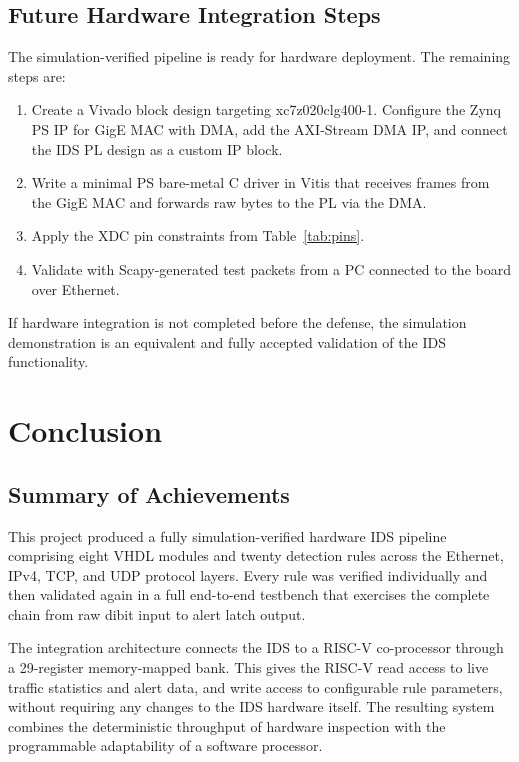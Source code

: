 \documentclass[12pt, a4paper]{report}
\begin{document}
\section{Future Hardware Integration Steps}

The simulation-verified pipeline is ready for hardware deployment. The remaining steps are:

\begin{enumerate}
    \item Create a Vivado block design targeting xc7z020clg400-1. Configure the Zynq PS IP for GigE MAC with DMA, add the AXI-Stream DMA IP, and connect the IDS PL design as a custom IP block.
    \item Write a minimal PS bare-metal C driver in Vitis that receives frames from the GigE MAC and forwards raw bytes to the PL via the DMA.
    \item Apply the XDC pin constraints from Table~\ref{tab:pins}.
    \item Validate with Scapy-generated test packets from a PC connected to the board over Ethernet.
\end{enumerate}

If hardware integration is not completed before the defense, the simulation demonstration is an equivalent and fully accepted validation of the IDS functionality.

\chapter{Conclusion}
\label{ch:conclusion}

\section{Summary of Achievements}

This project produced a fully simulation-verified hardware IDS pipeline comprising eight VHDL modules and twenty detection rules across the Ethernet, IPv4, TCP, and UDP protocol layers. Every rule was verified individually and then validated again in a full end-to-end testbench that exercises the complete chain from raw dibit input to alert latch output.

The integration architecture connects the IDS to a RISC-V co-processor through a 29-register memory-mapped bank. This gives the RISC-V read access to live traffic statistics and alert data, and write access to configurable rule parameters, without requiring any changes to the IDS hardware itself. The resulting system combines the deterministic throughput of hardware inspection with the programmable adaptability of a software processor.
\end{document}
